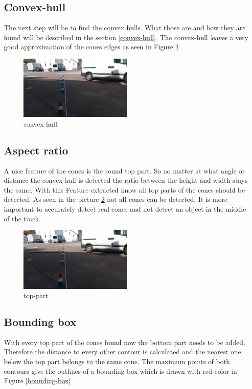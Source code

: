 \documentclass[10pt,a4paper]{article}
\begin{document}
	\subsection{Convex-hull}
	The next step will be to find the convex hulls. What those are and how they are found will be described in the section \ref{convex-hull}. The convex-hull leaves a very good approximation of the cones edges as seen in Figure \ref{convex-hull-picture}
	\begin{figure}[h]
		\centering
		\includegraphics[width=0.5\textwidth]{Abb/convex-hull.png}
		\caption{convex-hull}
		\label{convex-hull-picture}
	\end{figure}
	
	\subsection{Aspect ratio}
	A nice feature of the cones is the round top part. So no matter at what angle or distance the convex hull is detected the ratio between the height and width stays the same. With this Feature extracted know all top parts of the cones should be detected. As seen in the picture \ref{top-part} not all cones can be detected. It is more important to accurately detect real cones and not detect an object in the middle of the track.
	\begin{figure}[h]
		\centering
		\includegraphics[width=0.5\textwidth]{Abb/top_part_cone.png}
		\caption{top-part}
		\label{top-part}
	\end{figure}
	
	
	\subsection{Bounding box}
	With every top part of the cones found now the bottom part needs to be added. Therefore the distance to every other contour is calculated and the nearest one below the top part belongs to the same cone.
	The maximum points of both contours give the outlines of a bounding box which is drawn with red-color in Figure \ref{bounding-box}
	
\end{document}
